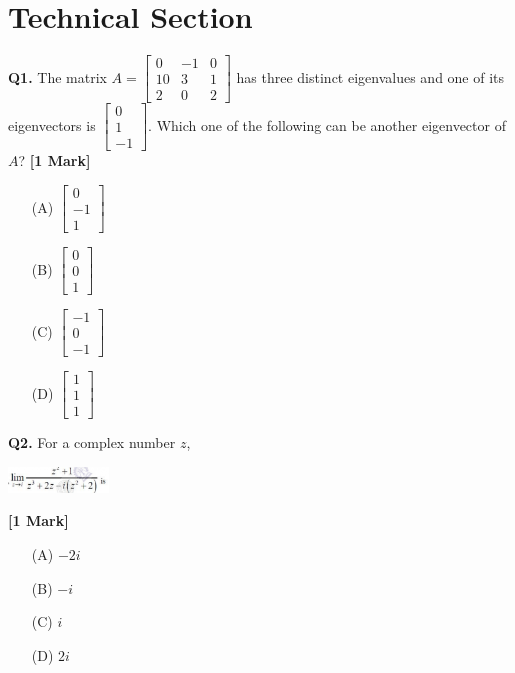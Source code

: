 \documentclass[11pt]{article}
\newcommand{\questiona}[2]{
    \noindent\textbf{Q#2.} #1 \hfill \textbf{[1 Mark]}
}
\begin{document}
\section*{Technical Section}

\questiona{The matrix \( A = \begin{bmatrix} 0 & -1 & 0 \\ 10 & 3 & 1 \\ 2 & 0 & 2 \end{bmatrix} \) has three distinct eigenvalues and one of its eigenvectors is \( \begin{bmatrix} 0 \\ 1 \\ -1 \end{bmatrix} \). Which one of the following can be another eigenvector of \( A \)?}{1}
\begin{enumerate}
    \item[(A)] \( \begin{bmatrix} 0 \\ -1 \\ 1 \end{bmatrix} \)  
    \item[(B)] \( \begin{bmatrix} 0 \\ 0 \\ 1 \end{bmatrix} \)  
    \item[(C)] \( \begin{bmatrix} -1 \\ 0 \\ -1 \end{bmatrix} \)  
    \item[(D)] \( \begin{bmatrix} 1 \\ 1 \\ 1 \end{bmatrix} \)  
\end{enumerate}
\vspace{0.5cm}

\questiona{For a complex number \( z \), \begin{center}
\includegraphics[width=0.2\textwidth]{figures/2.png}
\end{center}}{2}
\begin{enumerate}
    \item[(A)] \(-2i\)  
    \item[(B)] \(-i\)  
    \item[(C)] \(i\)  
    \item[(D)] \(2i\)  
\end{enumerate}
\vspace{0.5cm}
\end{document}
